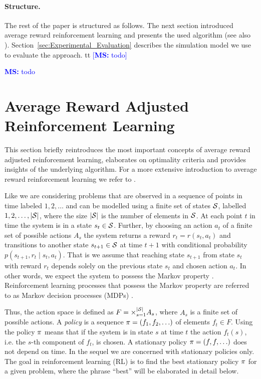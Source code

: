 \documentclass[envcountsame]{llncs}
\newcommand\MS[2][r]{\ifx t#1 \textcolor{blue}{[\textbf{MS:} #2]}
  \else \begin{center}\textcolor{blue}{\textbf{MS:} #2} \end{center} \fi}
\begin{document}
\paragraph{Structure.} The rest of the paper is structured as follows. The next section introduced
average reward reinforcement learning and presents the used algorithm (see also
\citealt{schneckenreither2020average}). Section~\ref{sec:Experimental_Evaluation} describes the
simulation model we use to evaluate the approach. \MS[t]{todo}


\section{Average Reward Adjusted Reinforcement Learning}

This section briefly reintroduces the most important concepts of average reward adjusted
reinforcement learning, elaborates on optimality criteria and provides insights of the underlying
algorithm. For a more extensive introduction to average reward reinforcement learning we refer to
\citet{schneckenreither2020average}.

Like \cite{MillerVeinott1969} we are considering problems that are observed in a sequence of points
in time labeled \(1,2,\ldots\) and can be modelled using a finite set of states \(\mathcal{S}\),
labelled \(1,2,\ldots,\lvert{\mathcal{S}}\rvert\), where the size \(\lvert{\mathcal{S}}\rvert\) is the number of elements
in \(\mathcal{S}\). At each point $t$ in time the system is in a state \(s_{t} \in \mathcal{S}\). Further,
by choosing an action $a_{t}$ of a finite set of possible actions \(A_{s}\) the system returns a
reward $r_{t} = r(s_{t}, a_{t})$ and transitions to another state \(s_{t+1} \in \mathcal{S}\) at time
\(t+1\) with conditional probability \(p(s_{t+1}, r_{t} \mid s_{t}, a_{t})\). That is we assume that
reaching state \(s_{t+1}\) from state \(s_{t}\) with reward \(r_{t}\) depends solely on the previous
state \(s_{t}\) and chosen action \(a_{t}\). In other words, we expect the system to possess the
Markov property \citep[p.63]{sutton1998introduction}. Reinforcement learning processes that possess
the Markov property are referred to as Markov decision processes (MDPs)
\citep[p.66]{sutton1998introduction}.

Thus, the action space is defined as \(F = \times_{s=1}^{\lvert{\mathcal{S}}\rvert} A_{s}\), where \(A_{s}\) is
a finite set of possible actions. A \emph{policy} is a sequence \(\pi = (f_{1},f_{2},\ldots)\) of
elements \(f_{t} \in F\). Using the policy \(\pi\) means that if the system is in state \(s\) at
time \(t\) the action \(f_{t}(s)\), i.e.%
the \(s\)-th component of \(f_{t}\), is chosen. A stationary policy \(\pi = (f,f,\ldots)\) does not
depend on time. In the sequel we are concerned with stationary policies only. The goal in
reinforcement learning (RL) is to find the best stationary policy \(\pi\) for a given problem,
where the phrase ``best'' will be elaborated in detail below.
\end{document}
